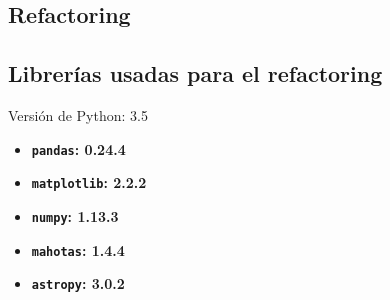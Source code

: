 \begin{appendix}
\section{Refactoring}
\subsection{Librer\'ias usadas para el refactoring}
\label{subs:a0}
Versi\'on de Python: 3.5
\begin{itemize}
\item \textbf{\texttt{pandas}: 0.24.4}
\item \textbf{\texttt{matplotlib}: 2.2.2}
\item \textbf{\texttt{numpy}: 1.13.3}
\item \textbf{\texttt{mahotas}: 1.4.4}
\item \textbf{\texttt{astropy}: 3.0.2}
\end{itemize}

\end{appendix}
